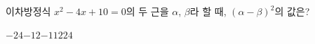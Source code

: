 이차방정식 $x^2-4x+10=0$의 두 근을 $\alpha$, $\beta$라 할 때, $(\alpha-\beta)^2$의 값은?
\begin{choices32}{$-24$}{$-12$}{$-1$}{$12$}{$24$}\end{choices32}

